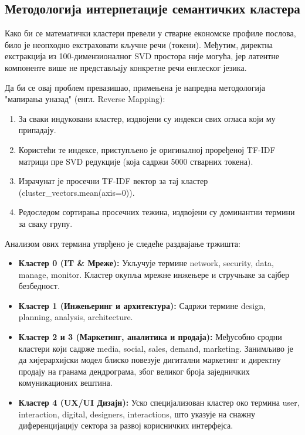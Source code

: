 \documentclass[a4paper,12pt]{report}
\begin{document}
	\subsection{Методологија интерпетације семантичких кластера}
	Како би се математички кластери превели у стварне економске профиле послова, било је неопходно екстраховати кључне речи (токени). Међутим, директна екстракција из 100-димензионалног SVD простора није могућа, јер латентне компоненте више не представљају конкретне речи енглеског језика.
	
	Да би се овај проблем превазишао, примењена је напредна методологија "мапирања уназад" (енгл. Reverse Mapping):
	
	\begin{enumerate}
	
	\item За сваки индуковани кластер, издвојени су индекси свих огласа који му припадају.
	
	\item Користећи те индексе, приступљено је оригиналној проређеној TF-IDF матрици пре SVD редукције (која садржи 5000 стварних токена).
	
	\item Израчунат је просечни TF-IDF вектор за тај кластер (cluster\_vectors.mean(axis=0)).
	
	\item Редоследом сортирања просечних тежина, издвојени су доминантни термини за сваку групу.
	
	\end{enumerate}
	
	Анализом ових термина утврђено је следеће раздвајање тржишта:
	
	\begin{itemize}
	
	\item \textbf{Кластер 0 (IT \& Мреже):} Укључује термине network, security, data, manage, monitor. Кластер окупља мрежне инжењере и стручњаке за сајбер безбедност.
	
	\item \textbf{Кластер 1 (Инжењеринг и архитектура):} Садржи термине design, planning, analysis, architecture.
	
	\item \textbf{Кластер 2 и 3 (Маркетинг, аналитика и продаја):} Међусобно сродни кластери који садрже media, social, sales, demand, marketing. Занимљиво је да хијерархијски модел блиско повезује дигитални маркетинг и директну продају на гранама дендрограма, због великог броја заједничких комуникационих вештина.
	
	\item \textbf{Кластер 4 (UX/UI Дизајн):} Уско специјализован кластер око термина user, interaction, digital, designers, interactions, што указује на снажну диференцијацију сектора за развој корисничких интерфејса.
	
	\end{itemize}
	
\end{document}
